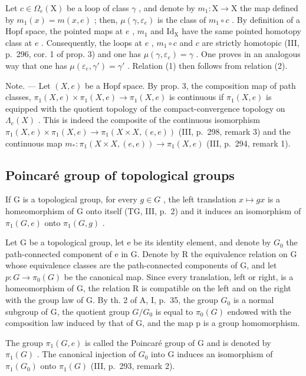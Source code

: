 Let \(c \in \Omega_e(\mathrm{X})\) be a loop of class \(\gamma\) , and denote by \(m_1 \colon \mathrm{X} \to \mathrm{X}\) the map defined by \(m_1(x) = m(x, e)\) ; then, \(\mu(\gamma, \varepsilon_e)\) is the class of \(m_1 \circ c\) . By definition of a Hopf space, the pointed maps at \(e\) , \(m_1\) and \(\mathrm{Id_X}\) have the same pointed homotopy class at \(e\) . Consequently, the loops at \(e\) , \(m_1 \circ c\) and \(c\) are strictly homotopic (III, p.~296, cor. 1 of prop. 3) and one has \(\mu(\gamma, \varepsilon_e) = \gamma\) . One proves in an analogous way that one has \(\mu(\varepsilon_e, \gamma') = \gamma'\) . Relation (1) then follows from relation (2).

Note. --- Let \((X,e)\) be a Hopf space. By prop. 3, the composition map of path classes, \(\pi_{1}(X,e)\times\pi_{1}(X,e)\to\pi_{1}(X,e)\) is continuous if \(\pi_{1}(X,e)\) is equipped with the quotient topology of the compact-convergence topology on \(\Lambda_{e}(X)\) . This is indeed the composite of the continuous isomorphism \(\pi_{1}(X,e)\times\pi_{1}(X,e)\to\pi_{1}(X\times X,(e,e))\) (III, p.~298, remark 3) and the continuous map \(m_{*}:\pi_{1}(X\times X,(e,e))\to\pi_{1}(X,e)\) (III, p.~294, remark 1).

\subsection{Poincaré group of topological groups}

If G is a topological group, for every \(g \in G\) , the left translation \(x \mapsto gx\) is a homeomorphism of G onto itself (TG, III, p.~2) and it induces an isomorphism of \(\pi_{1}(G, e)\) onto \(\pi_{1}(G, g)\) .

Let G be a topological group, let e be its identity element, and denote by \(G_{0}\) the path-connected component of e in G. Denote by R the equivalence relation on G whose equivalence classes are the path-connected components of G, and let \(p: G \to \pi_{0}(G)\) be the canonical map. Since every translation, left or right, is a homeomorphism of G, the relation R is compatible on the left and on the right with the group law of G. By th. 2 of A, I, p.~35, the group \(G_{0}\) is a normal subgroup of G, the quotient group \(G/G_{0}\) is equal to \(\pi_{0}(G)\) endowed with the composition law induced by that of G, and the map p is a group homomorphism.

The group \(\pi_{1}(G,e)\) is called the Poincaré group of G and is denoted by \(\pi_{1}(G)\) . The canonical injection of \(G_{0}\) into G induces an isomorphism of \(\pi_{1}(G_{0})\) onto \(\pi_{1}(G)\) (III, p.~293, remark 2).

